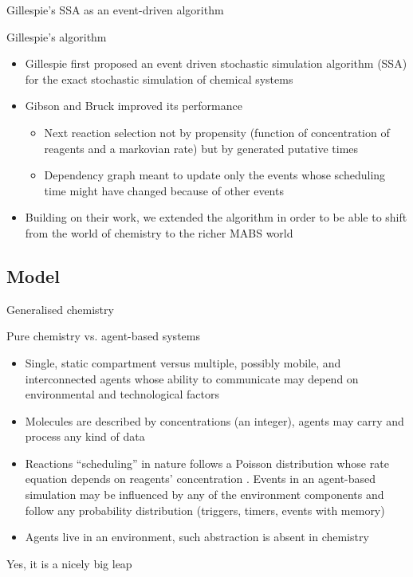 \documentclass[presentation]{beamer} %
\begin{document}
\begin{frame}{Gillespie's SSA as an event-driven algorithm}
  \begin{block}{Gillespie's algorithm}
    \begin{itemize}
      \item Gillespie first proposed an event driven stochastic simulation algorithm (SSA) for the exact stochastic simulation of chemical systems
      \item Gibson and Bruck \cite{gibson2000} improved its performance
      \begin{itemize}
	\item Next reaction selection not by propensity (function of concentration of reagents and a markovian rate) but by generated putative times
	\item Dependency graph meant to update only the events whose scheduling time might have changed because of other events
      \end{itemize}
      \item Building on their work, we extended the algorithm in order to be able to shift from the world of chemistry to the richer MABS world
    \end{itemize}
  \end{block}
\end{frame}

\subsection{Model}
\begin{frame}{Generalised chemistry}
\begin{block}{Pure chemistry vs. agent-based systems}
\begin{itemize}
 \item Single, static compartment versus multiple, possibly mobile, and interconnected agents whose ability to communicate may depend on environmental and technological factors
 \item Molecules are described by concentrations (an integer), agents may carry and process any kind of data
 \item Reactions ``scheduling'' in nature follows a Poisson distribution whose rate equation depends on reagents' concentration \cite{gillespie1977}. Events in an agent-based simulation may be influenced by any of the environment components and follow any probability distribution (triggers, timers, events with memory)
 \item Agents live in an environment, such abstraction is absent in chemistry
\end{itemize}
\end{block}
Yes, it is a nicely big leap
\end{frame}
\end{document}
